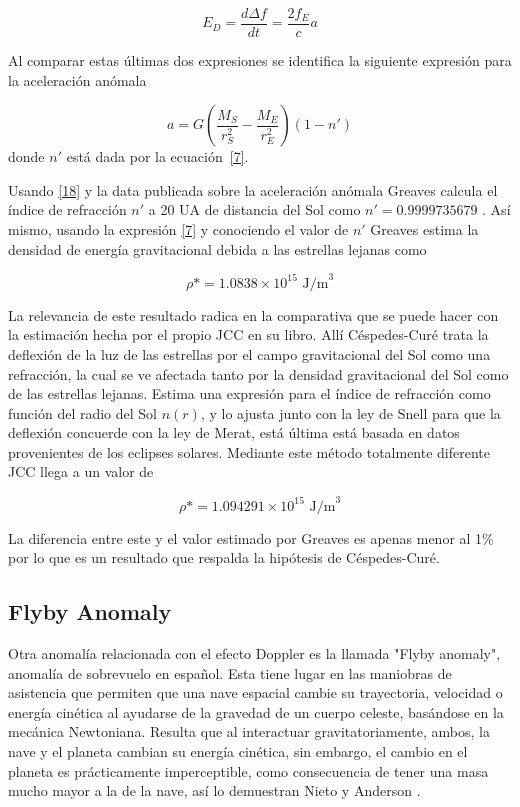 \begin{equation}
    E_D = \frac{d\Delta f}{dt} = \frac{2 f_E}{c}a
\end{equation}

Al comparar estas últimas dos expresiones se identifica la siguiente expresión para la aceleración anómala

\begin{equation} \label{18}
    a = G  \left(\frac{ M_S}{r_S^2} - \frac{M_E}{r_E^2} \right) (1-n')
\end{equation}
donde $n'$ está dada por la ecuación~\ref{7}.

Usando \eqref{18} y la data publicada sobre la aceleración anómala \cite{anderson1998} Greaves calcula el índice de refracción $n'$ a 20 UA de distancia del Sol como $n'=0.9999735679$  \cite{Cisnotconstant}. Así mismo, usando la expresión \eqref{7} y conociendo el valor de $n'$ Greaves estima la densidad de energía gravitacional debida a las estrellas lejanas como 

\begin{equation}
    \rho *=1.0838 \times 10^{15} \text{ J/m}^3
\end{equation}

La relevancia de este resultado radica en la comparativa que se puede hacer con la estimación hecha por el propio \ac{JCC} en su libro\cite{bib:el-libro}. Allí Céspedes-Curé trata la deflexión de la luz de las estrellas por el campo gravitacional del Sol como una refracción, la cual se ve afectada tanto por la densidad gravitacional del Sol como de las estrellas lejanas. Estima una expresión para el índice de refracción como función del radio del Sol $n(r)$, y lo ajusta junto con la ley de Snell para que la deflexión concuerde con la ley de Merat, está última está basada en datos provenientes de los eclipses solares. Mediante este método totalmente diferente \ac{JCC} llega a un valor de 

\begin{equation}
    \rho* = 1.094291 \times 10^{15}\text{ J/m}^{3}
\end{equation}

La diferencia entre este y el valor estimado por Greaves es apenas menor al 1\% por lo que es un resultado que respalda la hipótesis de Céspedes-Curé.

\subsection{Flyby Anomaly}
Otra anomalía relacionada con el efecto Doppler es la llamada "Flyby anomaly", anomalía de sobrevuelo en español. Esta tiene lugar en las maniobras de asistencia que permiten que una nave espacial cambie su trayectoria, velocidad o energía cinética al ayudarse de la gravedad de un cuerpo celeste, basándose en la mecánica Newtoniana. Resulta que al interactuar gravitatoriamente, ambos, la nave y el planeta cambian su energía cinética, sin embargo, el cambio en el planeta es prácticamente imperceptible, como consecuencia de tener una masa mucho mayor a la de la nave, así lo demuestran Nieto y Anderson \cite{flyby2009}.


